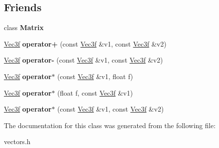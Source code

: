 \subsection*{\-Friends}
\begin{DoxyCompactItemize}
\item 
\hypertarget{classVec3f_a34913a9261681f734171a6da06bd56fe}{class {\bfseries \-Matrix}}\label{classVec3f_a34913a9261681f734171a6da06bd56fe}

\item 
\hypertarget{classVec3f_a8bb28d98335c4ef8c41a4f031fdc36aa}{\hyperlink{classVec3f}{\-Vec3f} {\bfseries operator+} (const \hyperlink{classVec3f}{\-Vec3f} \&v1, const \hyperlink{classVec3f}{\-Vec3f} \&v2)}\label{classVec3f_a8bb28d98335c4ef8c41a4f031fdc36aa}

\item 
\hypertarget{classVec3f_abcd62ac173dcf5e3e312dbce1fddcd54}{\hyperlink{classVec3f}{\-Vec3f} {\bfseries operator-\/} (const \hyperlink{classVec3f}{\-Vec3f} \&v1, const \hyperlink{classVec3f}{\-Vec3f} \&v2)}\label{classVec3f_abcd62ac173dcf5e3e312dbce1fddcd54}

\item 
\hypertarget{classVec3f_a490eea3a0be4e4978daa382e7fb68845}{\hyperlink{classVec3f}{\-Vec3f} {\bfseries operator$\ast$} (const \hyperlink{classVec3f}{\-Vec3f} \&v1, float f)}\label{classVec3f_a490eea3a0be4e4978daa382e7fb68845}

\item 
\hypertarget{classVec3f_abfe4ec12147bf5ebea8a0cc09da761da}{\hyperlink{classVec3f}{\-Vec3f} {\bfseries operator$\ast$} (float f, const \hyperlink{classVec3f}{\-Vec3f} \&v1)}\label{classVec3f_abfe4ec12147bf5ebea8a0cc09da761da}

\item 
\hypertarget{classVec3f_affeeb0e32bd8c131350b596a89216e35}{\hyperlink{classVec3f}{\-Vec3f} {\bfseries operator$\ast$} (const \hyperlink{classVec3f}{\-Vec3f} \&v1, const \hyperlink{classVec3f}{\-Vec3f} \&v2)}\label{classVec3f_affeeb0e32bd8c131350b596a89216e35}

\end{DoxyCompactItemize}


\-The documentation for this class was generated from the following file\-:\begin{DoxyCompactItemize}
\item 
vectors.\-h\end{DoxyCompactItemize}
